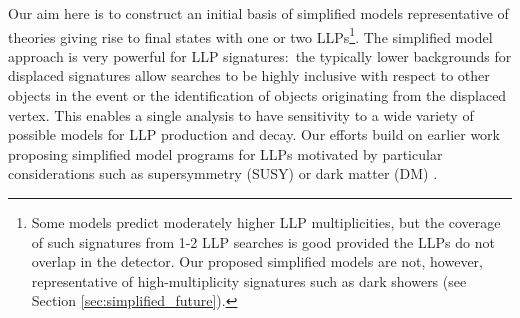 Our aim here is to construct an initial basis of simplified models representative of theories giving rise to final states with one or two LLPs\footnote{Some models predict moderately higher LLP multiplicities, but the coverage of such signatures from 1-2 LLP searches is good provided the LLPs do not overlap in the detector. Our proposed simplified models are not, however, representative of high-multiplicity signatures such as dark showers (see Section \ref{sec:simplified_future}).}.  The simplified model approach is very powerful for LLP signatures:~the typically lower backgrounds for displaced signatures allow searches to be highly inclusive with respect to other objects in the event or the identification of objects originating from the displaced vertex. This enables a single analysis to have sensitivity to a wide variety of possible models for LLP production and decay. Our efforts build on earlier work proposing simplified model programs for LLPs motivated by particular considerations such as supersymmetry (SUSY) or dark matter (DM) \cite{Heisig:2012zq,Liu:2015bma,Heisig:2015yla,Khoze:2017ixx,Mahbubani:2017gjh,Buchmueller:2017uqu}. 

